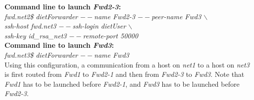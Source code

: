 \noindent\textbf{Command line to launch \textit{Fwd2-3}: }\\
{\small \it fwd.net2\$ dietForwarder {\tiny$--$}name Fwd2-3
  {\tiny$--$}peer-name Fwd3 $\backslash$\\
  \hspace*{4.2cm}{\tiny$--$}ssh-host fwd.net3 {\tiny$--$}ssh-login
  dietUser $\backslash$\\
  \hspace*{4.2cm}{\tiny$--$}ssh-key id\_rsa\_net3
  {\tiny$--$}remote-port 50000}\\[2mm]

\noindent\textbf{Command line to launch \textit{Fwd3}: }\\
{\small \it fwd.net3\$ dietForwarder {\tiny$--$}name Fwd3}\\[3mm]

Using this configuration, a communication from a host on \textit{net1}
to a host on \textit{net3} is first routed from \textit{Fwd1} to
\textit{Fwd2-1} and then from \textit{Fwd2-3} to \textit{Fwd3}.
Note that \textit{Fwd1} has to be launched before \textit{Fwd2-1}, and
\textit{Fwd3} has to be launched before \textit{Fwd2-3}.
